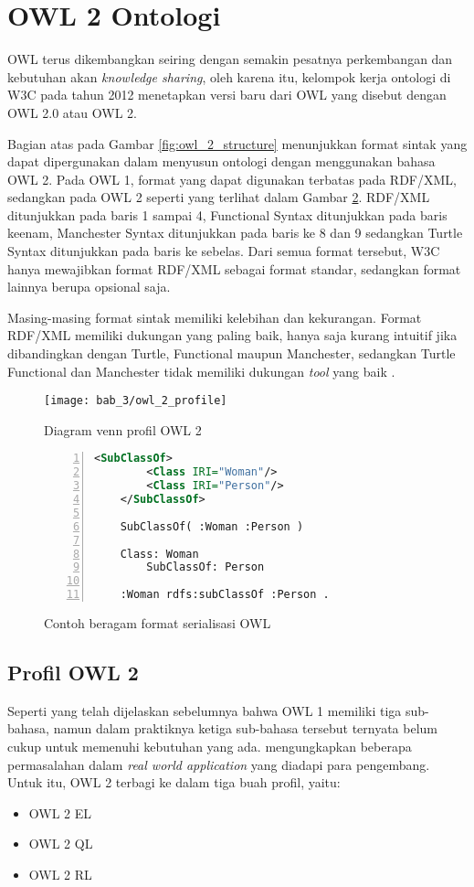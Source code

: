 \section{OWL 2 Ontologi}
OWL terus dikembangkan seiring dengan semakin pesatnya perkembangan dan kebutuhan akan \emph{knowledge sharing}, oleh karena itu, kelompok kerja ontologi di W3C pada tahun 2012 menetapkan versi baru dari OWL yang disebut dengan OWL 2.0 atau OWL 2.

Bagian atas pada Gambar \ref{fig:owl_2_structure} menunjukkan format sintak yang dapat dipergunakan dalam menyusun ontologi dengan menggunakan bahasa OWL 2. Pada OWL 1, format yang dapat digunakan terbatas pada RDF/XML, sedangkan pada OWL 2 seperti yang terlihat dalam Gambar \ref{fig:owl_serialization_formats}. RDF/XML ditunjukkan pada baris 1 sampai 4, Functional Syntax ditunjukkan pada baris keenam, Manchester Syntax ditunjukkan pada baris ke 8 dan 9 sedangkan Turtle Syntax ditunjukkan pada baris ke sebelas. Dari semua format tersebut, W3C hanya mewajibkan format RDF/XML sebagai format standar, sedangkan format lainnya berupa opsional saja.

Masing-masing format sintak memiliki kelebihan dan kekurangan. Format RDF/XML memiliki dukungan yang paling baik, hanya saja kurang intuitif jika dibandingkan dengan Turtle, Functional maupun Manchester, sedangkan Turtle Functional dan Manchester tidak memiliki dukungan \emph{tool} yang baik \citep{liyang_yu}.

\begin{figure}[ht]
	\centering
	\texttt{[image: bab\_3/owl\_2\_profile]}
	\caption{Diagram venn profil OWL 2}
	\label{fig:owl_2_profile}
\end{figure}

\begin{figure}[ht]
	\centering
	\begin{lstlisting}[language=XML, numbers=left]
	<SubClassOf>
		<Class IRI="Woman"/>
		<Class IRI="Person"/>
	</SubClassOf>

	SubClassOf( :Woman :Person )

	Class: Woman
		SubClassOf: Person

	:Woman rdfs:subClassOf :Person .\end{lstlisting}
	\caption{Contoh beragam format serialisasi OWL}
	\label{fig:owl_serialization_formats}
\end{figure}

\subsection{Profil OWL 2}
Seperti yang telah dijelaskan sebelumnya bahwa OWL 1 memiliki tiga sub-bahasa, namun dalam praktiknya ketiga sub-bahasa tersebut ternyata belum cukup untuk memenuhi kebutuhan yang ada. \citet{patel} mengungkapkan beberapa permasalahan dalam \emph{real world application} yang diadapi para pengembang. Untuk itu, OWL 2 terbagi ke dalam tiga buah profil, yaitu:
\begin{itemize}
	\item OWL 2 EL
	\item OWL 2 QL
	\item OWL 2 RL
\end{itemize}

